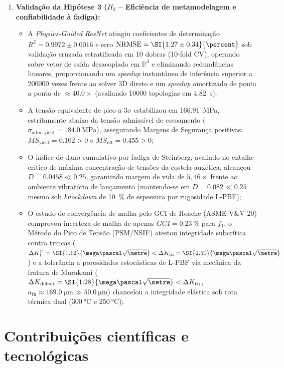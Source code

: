 \begin{enumerate}
  \item \textbf{Validação da Hipótese 3 ($H_3$ -- Eficiência de metamodelagem e confiabilidade à fadiga):}
  \begin{itemize}
    \item A \textit{Physics-Guided ResNet} atingiu coeficientes de determinação $\overline{R^2} = \num{0.9972} \pm \num{0.0016}$ e erro $\text{NRMSE} = \SI{1.27 \pm 0.34}{\percent}$ sob validação cruzada estratificada em 10 dobras ($10$-fold CV), operando sobre vetor de saída desacoplado em $\mathbb{R}^3$ e eliminando redundâncias lineares, proporcionando um \textit{speedup} instantâneo de inferência superior a \num{200000} vezes frente ao solver 3D direto e um \textit{speedup} amortizado de ponta a ponta de $\approx \num{40.0}\times$ (avaliando \num{10000} topologias em \SI{4.82}{\second});
    \item A tensão equivalente de pico a $3\sigma$ estabilizou em \SI{166.91}{\mega\pascal}, estritamente abaixo da tensão admissível de escoamento ($\sigma_{\text{adm, yield}} = \SI{184.0}{\mega\pascal}$), assegurando Margens de Segurança positivas: $MS_{\text{yield}} = \num{+0.102} > 0$ e $MS_{\text{ult}} = \num{+0.455} > 0$;
    \item O índice de dano cumulativo por fadiga de Steinberg, avaliado no entalhe crítico de máxima concentração de tensões da costela auxética, alcançou $D = \num{0.0458} \ll \num{0.25}$, garantindo margem de vida de $5{,}46\times$ frente ao ambiente vibratório de lançamento (mantendo-se em $D = \num{0.082} \ll \num{0.25}$ mesmo sob \textit{knockdown} de \SI{10}{\percent} de espessura por rugosidade L-PBF);
    \item O estudo de convergência de malha pelo GCI de Roache (ASME V\&V 20) comprovou incerteza de malha de apenas $GCI = \SI{0.23}{\percent}$ para $f_1$, o Método do Pico de Tensão (PSM/NSIF) atestou integridade subcrítica contra trincas ($\Delta K_1^V = \SI{1.12}{\mega\pascal\sqrt{\metre}} < \Delta K_{\text{th}} = \SI{2.50}{\mega\pascal\sqrt{\metre}}$) e a tolerância a porosidades estocásticas de L-PBF via mecânica da fratura de Murakami ($\Delta K_{\text{defect}} = \SI{1.28}{\mega\pascal\sqrt{\metre}} < \Delta K_{\text{th}}$, $a_{\text{th}} \approx \SI{169.0}{\micro\metre} \gg \SI{50.0}{\micro\metre}$) chancelou a integridade elástica sob rota térmica dual ($\SI{300}{\celsius}$ e $\SI{250}{\celsius}$);
  \end{itemize}
\end{enumerate}

\section{Contribuições científicas e tecnológicas}
\label{sec:conc-contribuicoes}

